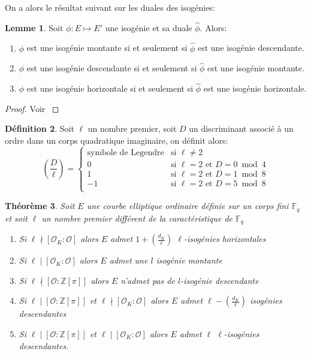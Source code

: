 \documentclass[10pt,a4paper]{book}
\theoremstyle{plain}
\newtheorem{thm}{Théorème}
\theoremstyle{definition}
\newtheorem{lem}[thm]{Lemme}
\theoremstyle{definition}
\theoremstyle{definition}
\theoremstyle{definition}
\newtheorem{defi}[thm]{Définition}
\theoremstyle{remark}
\theoremstyle{remark}
\begin{document}
On a alors le résultat suivant sur les duales des isogénies:
\begin{lem}Soit $\phi : E \mapsto E'$ une isogénie et sa duale $\widehat{\phi}$. Alors:
\begin{enumerate}
\item $\phi$ est une isogénie montante si et seulement si $\widehat{\phi}$ est une isogénie descendante.
\item $\phi$ est une isogénie descendante si et seulement si $\widehat{\phi}$ est une isogénie montante.
\item $\phi$ est une isogénie horizontale si et seulement si $\widehat{\phi}$ est une isogénie horizontale.
\end{enumerate}
\end{lem}

\begin{proof}
Voir \cite[Lemma 2.1]{FouquetMorain02}
\end{proof}

\begin{defi}
Soit $\ell$ un nombre premier, soit $D$ un discriminant associé à un ordre dans un corps quadratique imaginaire, on définit alors:
\begin{equation*}
\left( \frac{D}{\ell} \right)= \begin{cases}
  \text{symbole de Legendre} & \text{si } \ell\neq 2 \\
0 & \text{si } \ell=2 \text{ et } D=0 \bmod 4 \\
1 & \text{si } \ell=2 \text{ et } D=1 \bmod 8 \\
-1 & \text{si } \ell=2 \text{ et } D=5 \bmod 8 \\
\end{cases}
\end{equation*}
\end{defi}

\begin{thm}
Soit $E$ une courbe elliptique ordinaire définie sur un corps fini $\mathbb{F}_q$ et soit $\ell$ un nombre premier différent de la caractéristique de $\mathbb{F}_q$
\begin{enumerate}
\item Si $\ell \nmid [\mathcal{O}_K : \mathcal{O}]$ alors $E$ admet $ 1 + \left( \frac{d_K}{\ell} \right)$ $\ell$-isogénies horizontales
\item Si $\ell \mid [\mathcal{O}_K : \mathcal{O}]$ alors $E$ admet une $l$ isogénie montante
\item Si $\ell \nmid [\mathcal{O} : \mathbb{Z}[\pi]]$ alors $E$ n'admet pas de $l$-isogénie descendante
\item Si $\ell \mid [\mathcal{O} : \mathbb{Z}[\pi]]$ et $\ell \nmid [\mathcal{O}_K : \mathcal{O}]$ alors $E$ admet $\ell-\left( \frac{d_K}{\ell} \right)$ isogénies descendantes
\item  Si $\ell \mid [\mathcal{O} : \mathbb{Z}[\pi]]$ et $\ell \mid [\mathcal{O}_K : \mathcal{O}]$ alors $E$ admet $\ell$ $\ell$-isogénies descendantes.
\end{enumerate}
\end{thm}
\end{document}
